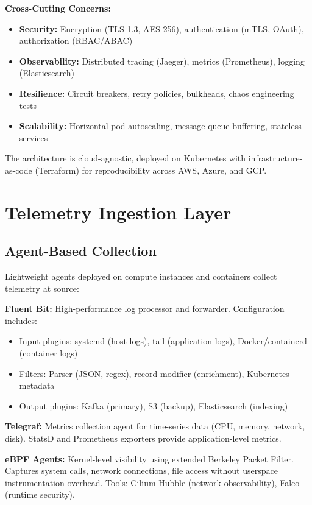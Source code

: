 \textbf{Cross-Cutting Concerns:}
\begin{itemize}
    \item \textbf{Security:} Encryption (TLS 1.3, AES-256), authentication (mTLS, OAuth), authorization (RBAC/ABAC)
    \item \textbf{Observability:} Distributed tracing (Jaeger), metrics (Prometheus), logging (Elasticsearch)
    \item \textbf{Resilience:} Circuit breakers, retry policies, bulkheads, chaos engineering tests
    \item \textbf{Scalability:} Horizontal pod autoscaling, message queue buffering, stateless services
\end{itemize}

The architecture is cloud-agnostic, deployed on Kubernetes with infrastructure-as-code (Terraform) for reproducibility across AWS, Azure, and GCP.

\section{Telemetry Ingestion Layer}\label{sec:arch-ingestion}
\subsection{Agent-Based Collection}
Lightweight agents deployed on compute instances and containers collect telemetry at source:

\textbf{Fluent Bit:} High-performance log processor and forwarder. Configuration includes:
\begin{itemize}
    \item Input plugins: systemd (host logs), tail (application logs), Docker/containerd (container logs)
    \item Filters: Parser (JSON, regex), record modifier (enrichment), Kubernetes metadata
    \item Output plugins: Kafka (primary), S3 (backup), Elasticsearch (indexing)
\end{itemize}

\textbf{Telegraf:} Metrics collection agent for time-series data (CPU, memory, network, disk). StatsD and Prometheus exporters provide application-level metrics.

\textbf{eBPF Agents:} Kernel-level visibility using extended Berkeley Packet Filter. Captures system calls, network connections, file access without userspace instrumentation overhead. Tools: Cilium Hubble (network observability), Falco (runtime security).

